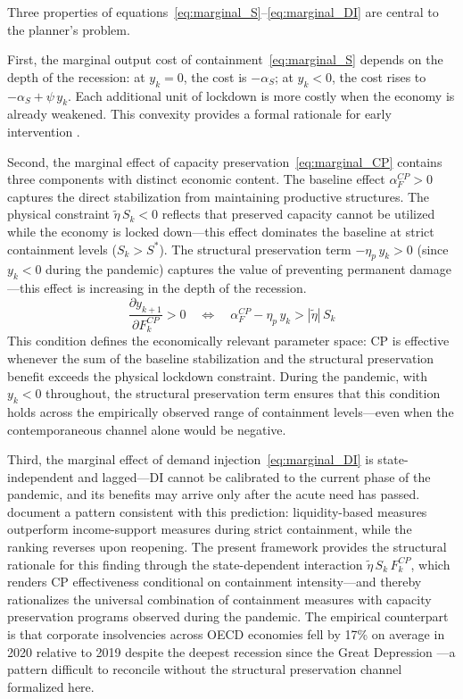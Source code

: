 \documentclass[12pt, a4paper]{article}
\begin{document}
\noindent Three properties of equations~\eqref{eq:marginal_S}--\eqref{eq:marginal_DI} are central to the planner's problem.

First, the marginal output cost of containment~\eqref{eq:marginal_S} depends on the depth of the recession: at $y_k = 0$, the cost is $-\alpha_S$; at $y_k < 0$, the cost rises to $-\alpha_S + \psi\, y_k$. Each additional unit of lockdown is more costly when the economy is already weakened. This convexity provides a formal rationale for early intervention \citep{acemoglu2021}.

Second, the marginal effect of capacity preservation~\eqref{eq:marginal_CP} contains three components with distinct economic content. The baseline effect $\alpha^{CP}_F > 0$ captures the direct stabilization from maintaining productive structures. The physical constraint $\tilde{\eta}\, S_k < 0$ reflects that preserved capacity cannot be utilized while the economy is locked down---this effect dominates the baseline at strict containment levels ($S_k > S^*$). The structural preservation term $-\eta_p\, y_k > 0$ (since $y_k < 0$ during the pandemic) captures the value of preventing permanent damage---this effect is increasing in the depth of the recession.
%
\begin{equation}
    \frac{\partial y_{k+1}}{\partial F^{CP}_k} > 0 \quad \Longleftrightarrow \quad \alpha^{CP}_F - \eta_p\, y_k > |\tilde{\eta}|\, S_k
    \label{eq:cp_positive}
\end{equation}
%
This condition defines the economically relevant parameter space: CP is effective whenever the sum of the baseline stabilization and the structural preservation benefit exceeds the physical lockdown constraint. During the pandemic, with $y_k < 0$ throughout, the structural preservation term ensures that this condition holds across the empirically observed range of containment levels---even when the contemporaneous channel alone would be negative.

Third, the marginal effect of demand injection~\eqref{eq:marginal_DI} is state-independent and lagged---DI cannot be calibrated to the current phase of the pandemic, and its benefits may arrive only after the acute need has 
passed. \citet{deb2021} document a pattern consistent with this prediction: liquidity-based measures outperform income-support measures during strict containment, while the ranking reverses upon reopening. The present framework provides the structural rationale for this finding through the state-dependent interaction $\tilde{\eta}\,S_k\,F^{CP}_k$, which renders CP effectiveness conditional on containment intensity---and thereby rationalizes the universal combination of containment measures with capacity preservation programs observed during the pandemic. The empirical 
counterpart is that corporate insolvencies across OECD economies fell by 17\% on average in 2020 relative to 2019 despite the deepest recession since the Great Depression \citep{djankov2021, banerjee2021}---a pattern difficult to reconcile without the structural preservation channel formalized here.
\end{document}
